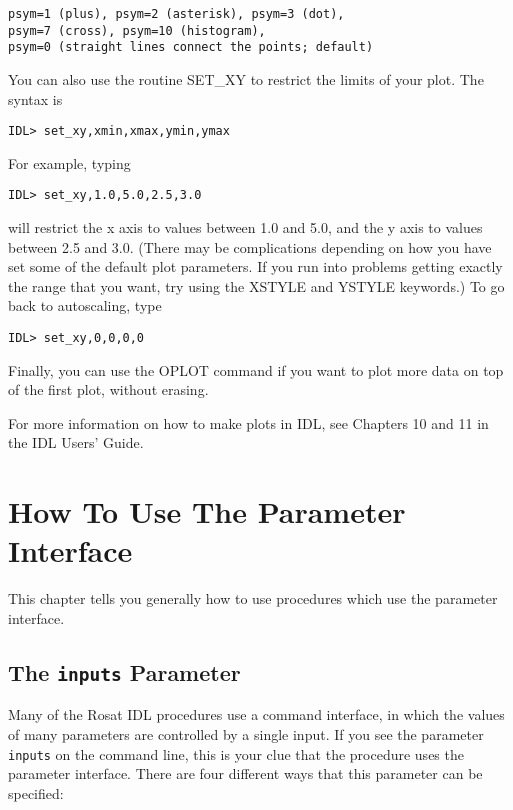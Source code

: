 \medskip\noindent
\begin{verbatim}
psym=1 (plus), psym=2 (asterisk), psym=3 (dot),
psym=7 (cross), psym=10 (histogram),
psym=0 (straight lines connect the points; default)
\end{verbatim}
You can also use the routine SET{\_}XY to restrict the limits of your plot. The
syntax is

\medskip\noindent
\begin{verbatim}
IDL> set_xy,xmin,xmax,ymin,ymax
\end{verbatim}
For example, typing

\medskip\noindent
\begin{verbatim}
IDL> set_xy,1.0,5.0,2.5,3.0
\end{verbatim}
will restrict the x axis to values between 1.0 and 5.0, and the y axis to
values between 2.5 and 3.0. (There may be complications depending on how you
have set some of the default plot parameters. If you run into problems getting
exactly the range that you want, try using the XSTYLE and YSTYLE keywords.) To
go back to autoscaling, type

\medskip\noindent
\begin{verbatim}
IDL> set_xy,0,0,0,0
\end{verbatim}
Finally, you can use the OPLOT command if you want to plot more data on top of
the first plot, without erasing.
 
For more information on how to make plots in IDL, see Chapters 10 and 11 in the
IDL Users' Guide.
 
\chapter{How To Use The Parameter Interface }
 
This chapter tells you generally how to use procedures which use the parameter
interface.
 

\section{The {\tt inputs}  Parameter}
 
Many of the Rosat IDL procedures use a command interface, in which the values
of many parameters are controlled by a single input. If you see the parameter
{\tt inputs} on the command line, this is your clue that the procedure uses the
parameter interface. There are four different ways that this parameter can be
specified:

